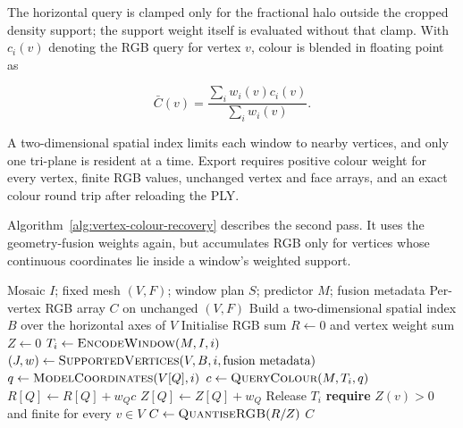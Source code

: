 The horizontal query is clamped only for the fractional halo outside the
cropped density support; the support weight itself is evaluated without that
clamp.  With $c_i(v)$ denoting the RGB query for vertex $v$, colour is blended
in floating point as

\begin{equation}
\bar{C}(v)=\frac{\sum_i w_i(v)c_i(v)}{\sum_i w_i(v)}.
\label{eq:colour-feather-fusion}
\end{equation}

A two-dimensional spatial index limits each window to nearby vertices, and
only one tri-plane is resident at a time.  Export requires positive colour
weight for every vertex, finite RGB values, unchanged vertex and face arrays,
and an exact colour round trip after reloading the PLY.

Algorithm~\ref{alg:vertex-colour-recovery} describes the second pass.  It uses
the geometry-fusion weights again, but accumulates RGB only for vertices whose
continuous coordinates lie inside a window's weighted support.

\begin{algorithm}[H]
\caption{Memory-bounded recovery of colour on a fixed global mesh}
\label{alg:vertex-colour-recovery}
\begin{algorithmic}[1]
\Require Mosaic $I$; fixed mesh $(V,F)$; window plan $S$; predictor $M$;
fusion metadata
\Ensure Per-vertex RGB array $C$ on unchanged $(V,F)$
\State Build a two-dimensional spatial index $B$ over the horizontal axes of $V$
\State Initialise RGB sum $R\gets 0$ and vertex weight sum $Z\gets 0$
  \State $T_i\gets\Call{EncodeWindow}{M,I,i}$ 
  \State $(J,w)\gets\Call{SupportedVertices}{V,B,i,\text{fusion metadata}}$
    \State $q\gets\Call{ModelCoordinates}{V[Q],i}$
    \State $c\gets\Call{QueryColour}{M,T_i,q}$
    \State $R[Q]\gets R[Q]+w_Qc$
    \State $Z[Q]\gets Z[Q]+w_Q$
  \EndFor
  \State Release $T_i$
\EndFor
\State \textbf{require} $Z(v)>0$ and finite for every $v\in V$
\State $C\gets\Call{QuantiseRGB}{R/Z}$
\State {}
\State \Return $C$
\end{algorithmic}
\end{algorithm}

